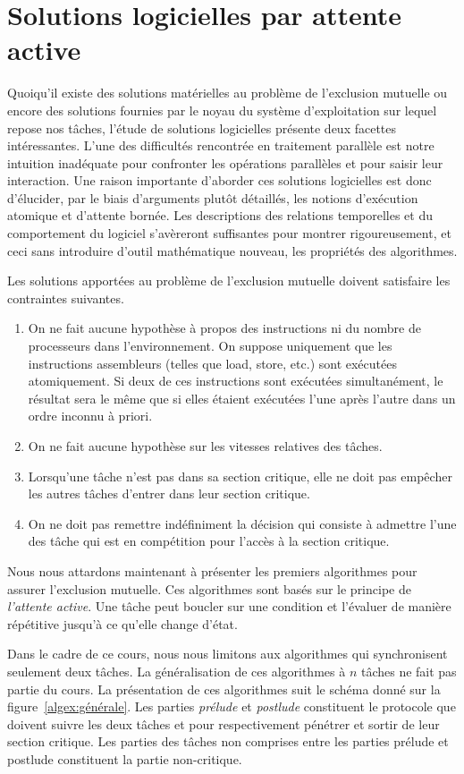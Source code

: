 \section{Solutions logicielles par attente active}
Quoiqu'il existe des solutions matérielles au problème de l'exclusion mutuelle ou encore des solutions fournies par le noyau du système d'exploitation sur lequel repose nos tâches, l'étude de solutions logicielles présente deux facettes intéressantes.  L'une des difficultés rencontrée en traitement parallèle est notre intuition inadéquate pour confronter les opérations parallèles et pour saisir leur interaction. Une raison importante d'aborder ces solutions logicielles est donc d'élucider, par le biais d'arguments plutôt détaillés, les notions d'exécution atomique et d'attente bornée.
Les descriptions des relations temporelles et du comportement du logiciel s'avèreront suffisantes pour montrer rigoureusement, et ceci sans introduire d'outil mathématique nouveau, les propriétés des algorithmes.

Les solutions apportées au problème de l'exclusion mutuelle doivent satisfaire les contraintes suivantes.
\begin{enumerate}
\item On ne fait aucune hypothèse à propos des instructions ni du nombre de processeurs dans l'environnement.
On suppose uniquement que les instructions assembleurs (telles que load, store, etc.) sont exécutées atomiquement.  Si deux de ces instructions sont exécutées simultanément, le résultat sera le même que si elles étaient exécutées l'une après l'autre dans un ordre inconnu à priori.
\item On ne fait aucune hypothèse sur les vitesses relatives des tâches.
\item Lorsqu'une tâche n'est pas dans sa section critique, elle ne doit pas empêcher les autres tâches d'entrer dans leur section critique.
\item On ne doit pas remettre indéfiniment la décision qui consiste à admettre l'une des tâche qui est en compétition pour l'accès à la section critique.
\end{enumerate}
\par
Nous nous attardons maintenant à présenter les premiers algorithmes pour assurer l'exclusion mutuelle.  Ces algorithmes sont basés sur le principe de {\em l'attente active}.  Une tâche peut boucler sur une condition et l'évaluer de manière répétitive jusqu'à ce qu'elle change d'état.
\par
Dans le cadre de ce cours, nous nous limitons aux algorithmes qui synchronisent seulement deux tâches.  La généralisation de ces algorithmes à $n$ tâches ne fait pas partie du cours.  La présentation de ces algorithmes suit le schéma donné sur la figure~\ref{algex:générale}.
Les parties {\em prélude} et {\em postlude} constituent le protocole que doivent suivre les deux tâches  et  pour respectivement pénétrer et sortir de leur section critique.  Les parties des tâches non comprises entre les parties prélude et postlude constituent la partie non-critique.


